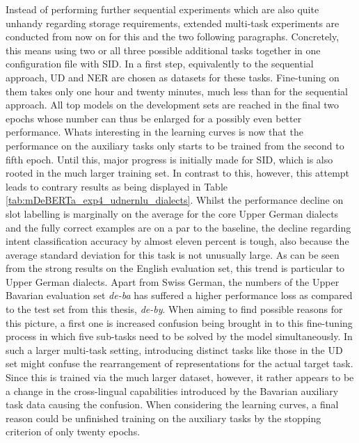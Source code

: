 \documentclass[11pt,a4paper,twoside,openright]{scrbook}
\begin{document}
Instead of performing further sequential experiments which are also quite unhandy regarding storage requirements, extended multi-task experiments are conducted from now on for this and the two following paragraphs. Concretely, this means using two or all three possible additional tasks together in one configuration file with SID. In a first step, equivalently to the sequential approach, UD and NER are chosen as datasets for these tasks. Fine-tuning on them takes only one hour and twenty minutes, much less than for the sequential approach. All top models on the development sets are reached in the final two epochs whose number can thus be enlarged for a possibly even better performance. Whats interesting in the learning curves is now that the performance on the auxiliary tasks only starts to be trained from the second to fifth epoch. Until this, major progress is initially made for SID, which is also rooted in the much larger training set. In contrast to this, however, this attempt leads to contrary results as being displayed in Table \ref{tab:mDeBERTa_exp4_udnernlu_dialects}. Whilst the performance decline on slot labelling is marginally on the average for the core Upper German dialects and the fully correct examples are on a par to the baseline, the decline regarding intent classification accuracy by almost eleven percent is tough, also because the average standard deviation for this task is not unusually large. As can be seen from the strong results on the English evaluation set, this trend is particular to Upper German dialects. Apart from Swiss German, the numbers of the Upper Bavarian evaluation set \textit{de-ba} has suffered a higher performance loss as compared to the test set from this thesis, \textit{de-by}. When aiming to find possible reasons for this picture, a first one is increased confusion being brought in to this fine-tuning process in which five sub-tasks need to be solved by the model simultaneously. In such a larger multi-task setting, introducing distinct tasks like those in the UD set might confuse the rearrangement of representations for the actual target task. Since this is trained via the much larger dataset, however, it rather appears to be a change in the cross-lingual capabilities introduced by the Bavarian auxiliary task data causing the confusion. When considering the learning curves, a final reason could be unfinished training on the auxiliary tasks by the stopping criterion of only twenty epochs.
\end{document}
